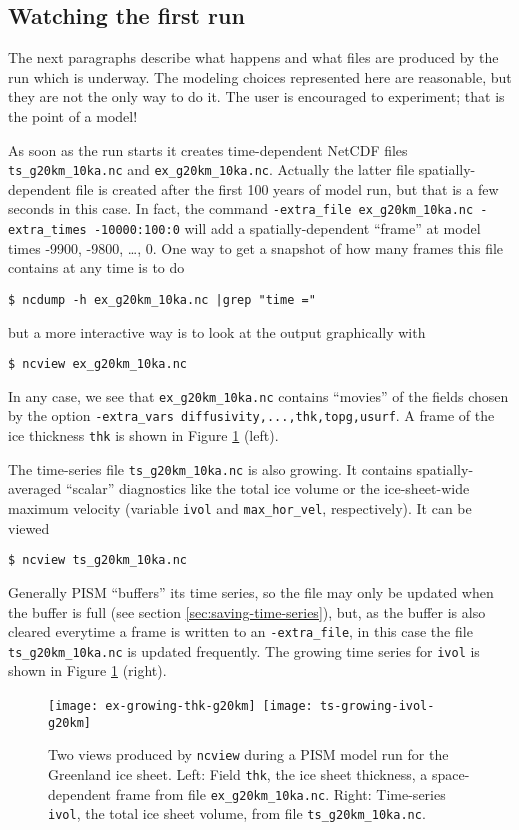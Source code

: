 \subsection{Watching the first run}  \label{subsect:watchrun}  The next paragraphs describe what happens and what files are produced by the run which is underway.  The modeling choices represented here are reasonable, but they are not the only way to do it.  The user is encouraged to experiment; that is the point of a model!

As soon as the run starts it creates time-dependent NetCDF files \texttt{ts_g20km_10ka.nc} and \texttt{ex_g20km_10ka.nc}.  Actually the latter file spatially-dependent file is created after the first 100 years of model run, but that is a few seconds in this case.  In fact, the command \texttt{-extra_file ex_g20km_10ka.nc -extra_times -10000:100:0} will add a spatially-dependent ``frame'' at model times -9900, -9800, \dots, 0.  One way to get a snapshot of how many frames this file contains at any time is to do
\begin{verbatim}
$ ncdump -h ex_g20km_10ka.nc |grep "time ="
\end{verbatim}
but a more interactive way is to look at the output graphically with
\begin{verbatim}
$ ncview ex_g20km_10ka.nc
\end{verbatim}
In any case, we see that \texttt{ex_g20km_10ka.nc} contains ``movies'' of the fields chosen by the option \texttt{-extra_vars diffusivity,...,thk,topg,usurf}.  A frame of the ice thickness \texttt{thk} is shown in Figure \ref{fig:growing} (left).

The time-series file \texttt{ts_g20km_10ka.nc} is also growing.  It contains spatially-averaged ``scalar'' diagnostics like the total ice volume or the ice-sheet-wide maximum velocity (variable \texttt{ivol} and \texttt{max_hor_vel}, respectively).  It can be viewed
\begin{verbatim}
$ ncview ts_g20km_10ka.nc
\end{verbatim}
Generally PISM ``buffers'' its time series, so the file may only be updated when the buffer is full (see section \ref{sec:saving-time-series}), but, as the buffer is also cleared everytime a frame is written to an \texttt{-extra_file}, in this case the file \texttt{ts_g20km_10ka.nc} is updated frequently.  The growing time series for \texttt{ivol} is shown in Figure \ref{fig:growing} (right).

\begin{figure}[ht]
\centering
\mbox{\texttt{[image: ex-growing-thk-g20km]}
  \qquad \texttt{[image: ts-growing-ivol-g20km]}}
\caption{Two views produced by \texttt{ncview} during a PISM model run for the Greenland ice sheet.  Left: Field \texttt{thk}, the ice sheet thickness, a space-dependent frame from file \texttt{ex_g20km_10ka.nc}.  Right: Time-series \texttt{ivol}, the total ice sheet volume, from file \texttt{ts_g20km_10ka.nc}. }
\label{fig:growing}
\end{figure}

